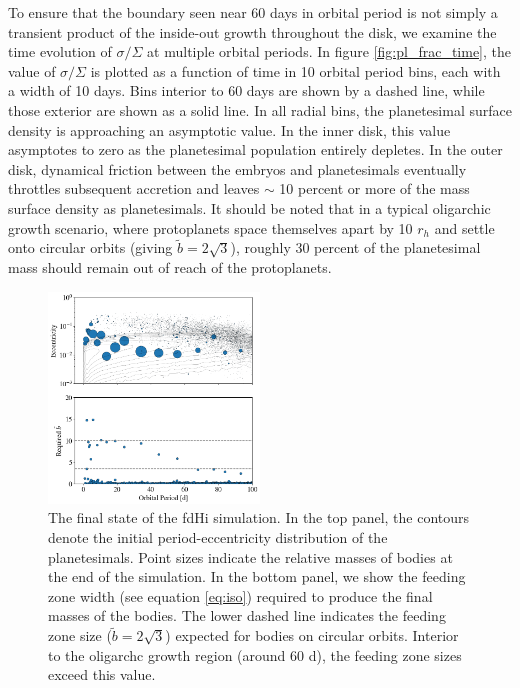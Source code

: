 \documentclass[twocolumn]{aastex63}
\begin{document}
To ensure that the boundary seen near 60 days in orbital period is not
simply a transient product of the inside-out growth throughout the
disk, we examine the time evolution of $\sigma/\Sigma$ at multiple
orbital periods. In figure \ref{fig:pl_frac_time}, the value of
$\sigma/\Sigma$ is plotted as a function of time in 10 orbital period
bins, each with a width of 10 days.
Bins interior to 60 days are shown by a dashed line, while those exterior are shown as a solid line. In all radial bins, the 
planetesimal surface density is approaching an asymptotic value. In the inner disk, this value asymptotes to zero as the 
planetesimal population entirely depletes. In the outer disk, dynamical friction between the embryos and planetesimals 
eventually throttles subsequent accretion and leaves $\sim$ 10 percent or more of the mass surface density as planetesimals. It 
should be noted that in a typical oligarchic growth scenario, where protoplanets space themselves apart by 10 $r_{h}$ and settle 
onto circular orbits (giving $\tilde{b} = 2 \sqrt{3}$), roughly 30 percent of the planetesimal mass should remain out of reach of the 
protoplanets.


\begin{figure}
\begin{center}
    \includegraphics[width=0.5\textwidth]{figures/fulldisk_e_m_b.png}
    \caption{The final state of the fdHi simulation. In the top panel,
      the contours denote the initial period-eccentricity distribution
      of the planetesimals. Point sizes indicate the relative masses
      of bodies at the end of the simulation. In the bottom panel, we show the
      feeding zone width (see equation \ref{eq:iso}) required to produce
      the final masses of the bodies. The lower dashed line indicates the feeding
      zone size ($\tilde{b} = 2 \sqrt{3}$) expected for bodies on circular orbits. Interior to the oligarchc
      growth region (around 60 d), the feeding zone sizes exceed this value.\label{fig:fulldisk_e_m}}
\end{center}
\end{figure}
\end{document}
